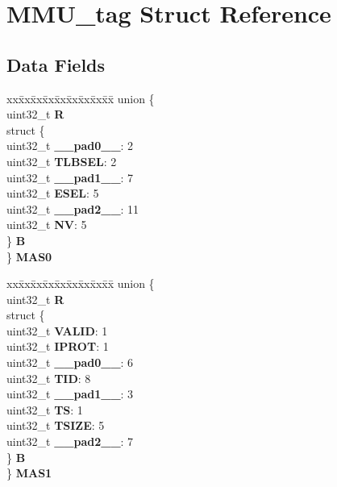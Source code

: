 \hypertarget{structMMU__tag}{}\section{M\+M\+U\+\_\+tag Struct Reference}
\label{structMMU__tag}
\subsection*{Data Fields}
\begin{DoxyCompactItemize}
\item 
\mbox{\label{structMMU__tag_a5abb6b6da55a80a1ba19a202e747d94a}} 
\begin{tabbing}
xx\=xx\=xx\=xx\=xx\=xx\=xx\=xx\=xx\=\kill
union \{\\
\>uint32\_t {\bfseries R}\\
\>struct \{\\
\>\>uint32\_t {\bfseries \_\_pad0\_\_}: 2\\
\>\>uint32\_t {\bfseries TLBSEL}: 2\\
\>\>uint32\_t {\bfseries \_\_pad1\_\_}: 7\\
\>\>uint32\_t {\bfseries ESEL}: 5\\
\>\>uint32\_t {\bfseries \_\_pad2\_\_}: 11\\
\>\>uint32\_t {\bfseries NV}: 5\\
\>\} {\bfseries B}\\
\} {\bfseries MAS0}\\

\end{tabbing}\item 
\mbox{\label{structMMU__tag_aa0e3cba277eb3f988bc1d4dcf6ee357a}} 
\begin{tabbing}
xx\=xx\=xx\=xx\=xx\=xx\=xx\=xx\=xx\=\kill
union \{\\
\>uint32\_t {\bfseries R}\\
\>struct \{\\
\>\>uint32\_t {\bfseries VALID}: 1\\
\>\>uint32\_t {\bfseries IPROT}: 1\\
\>\>uint32\_t {\bfseries \_\_pad0\_\_}: 6\\
\>\>uint32\_t {\bfseries TID}: 8\\
\>\>uint32\_t {\bfseries \_\_pad1\_\_}: 3\\
\>\>uint32\_t {\bfseries TS}: 1\\
\>\>uint32\_t {\bfseries TSIZE}: 5\\
\>\>uint32\_t {\bfseries \_\_pad2\_\_}: 7\\
\>\} {\bfseries B}\\
\} {\bfseries MAS1}\\


\end{tabbing}
\end{DoxyCompactItemize}
